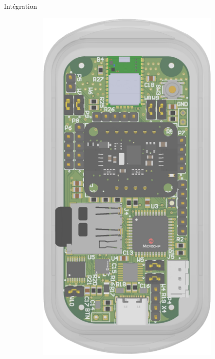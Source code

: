 \documentclass{beamer}
\begin{document}
\begin{frame}{Intégration}
	\begin{figure}[!h]
		\centering
		\begin{subfigure}[b]{0.24\textwidth}
			\centering
			\includegraphics[width=\textwidth]{../figures/dev-pcb/3d-view3}

\end{subfigure}
\end{figure}
\end{frame}
\end{document}
